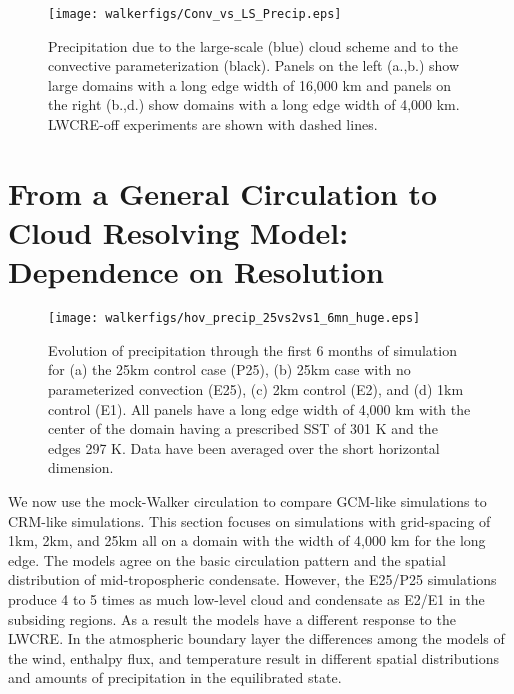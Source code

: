\documentclass[draft]{agujournal2019}
\begin{document}
{\begin{figure}
  \centering
      \texttt{[image: walkerfigs/Conv\_vs\_LS\_Precip.eps]}
  \caption{Precipitation due to the large-scale (blue) cloud scheme and to the convective 
  parameterization (black).  
  Panels on the left (a.,b.) show large domains with a long edge width of 16,000 km and
  panels on the right (b.,d.) show domains with a long edge width of 4,000 km.  LWCRE-off experiments are shown with dashed lines.  }
  \label{fig:conv_vs_ls}
\end{figure}



\section{From a General Circulation to Cloud Resolving Model: Dependence on Resolution}

\begin{figure}
  \texttt{[image: walkerfigs/hov\_precip\_25vs2vs1\_6mn\_huge.eps]}
  \caption{Evolution of precipitation through the first 6 months of simulation for (a) the 25km control case (P25), 
  (b) 25km case with no parameterized convection (E25), (c) 2km control (E2), and (d) 1km control (E1).  
  All panels have a long edge width of 4,000 km with the center of the domain having a prescribed SST of 301 K and the edges 297 K.  
  Data have been averaged over the short horizontal dimension.} 
  \label{fig:hov_4mods_6mn}
\end{figure}


We now use the mock-Walker circulation to compare GCM-like simulations to CRM-like simulations.  
This section focuses on simulations with grid-spacing of 1km, 2km, and 25km all on a domain with the width of 4,000 km for the long edge.  
The models agree on the basic circulation pattern and the spatial distribution of mid-tropospheric condensate.  
However, the E25/P25 simulations produce 4 to 5 times as much low-level cloud and 
condensate as E2/E1 in the subsiding regions.   As a result the models have a different response 
to the LWCRE.  In the atmospheric boundary layer the differences among the models of the wind, enthalpy flux, and 
temperature result in different spatial distributions and amounts of precipitation in the equilibrated state.  

}
\end{document}
